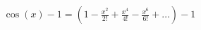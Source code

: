 \documentclass[preview]{standalone}
\begin{document}
\begin{align*}
\cos(x) - 1 = \left( 1 - \frac{x^2}{2!} + \frac{x^4}{4!} - \frac{x^6}{6!} + \dots \right) - 1
\end{align*}
\end{document}
